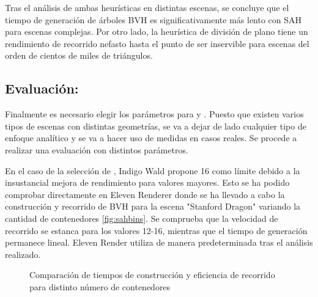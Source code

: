 Tras el análisis de ambas heurísticas en distintas escenas, se concluye que el tiempo de generación de árboles BVH es significativamente más lento con SAH para escenas complejas. Por otro lado, la heurística de división de plano tiene un rendimiento de recorrido nefasto hasta el punto de ser inservible para escenas del orden de cientos de miles de triángulos.
	
\subsection{Evaluación:}
	
Finalmente es necesario elegir los parámetros para  y . Puesto que existen varios tipos de escenas con distintas geometrías, se va a dejar de lado cualquier tipo de enfoque analítico y se va a hacer uso de medidas en casos reales. Se procede a realizar una evaluación con distintos parámetros.
	
En el caso de la selección de , Indigo Wald propone 16 como límite \cite{wald2007fast} debido a la insustancial mejora de rendimiento para valores mayores. Esto se ha podido comprobar directamente en Eleven Renderer donde se ha llevado a cabo la construcción y recorrido de BVH para la escena "Stanford Dragon" variando la cantidad de contenedores \autoref{fig:sahbins}. Se comprueba que la velocidad de recorrido se estanca para los valores 12-16, mientras que el tiempo de generación permanece lineal. Eleven Render utiliza de manera predeterminada  tras el análisis realizado.

\begin{figure}[H]
\centering
{}
\caption{Comparación de tiempos de construcción y eficiencia de recorrido para distinto número de contenedores}
\label{fig:sahbins}
\end{figure}